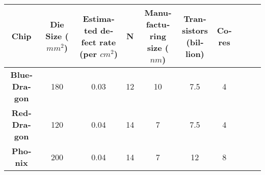 \begin{latin}
	\begin{center}
		\begin{tabular}{c c c c c c c c c c} 
			\hline\hline
			\textbf{Chip} & \thead{Die Size \\ ($mm^2$)} & \thead{Estimated defect \\rate (per $cm^2$)} & \textbf{N} & \thead{Manufacturing \\ size ($nm$)} & \thead{Transistors \\ (billion)} & \textbf{Cores}\\ [0.5ex] 
			\hline\hline
			\textbf{BlueDragon} & 180 & 0.03 & 12 & 10 & 7.5 & 4\\ 
			\hline
			\textbf{RedDragon} & 120 & 0.04 & 14 & 7 & 7.5 & 4\\
			\hline
			\textbf{Phonix} & 200 & 0.04 & 14 & 7 & 12 & 8 \\ [1ex] 
			\hline\hline
		\end{tabular}
	\end{center}
\end{latin}

\newpage
